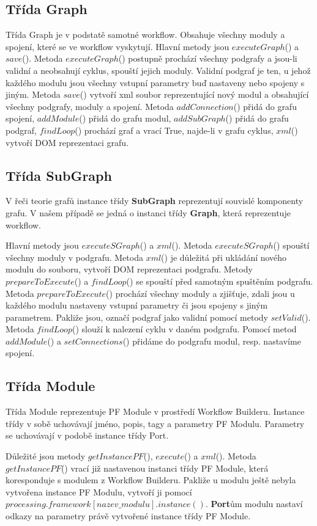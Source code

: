 \newpage
\subsection*{Třída Graph}
Třída Graph je v podstatě samotné workflow. Obsahuje všechny moduly a spojení, které se ve workflow vyskytují. Hlavní metody jsou $executeGraph$() a $save$(). Metoda $executeGraph$() postupně prochází všechny podgrafy a jsou-li validní a neobsahují cyklus, spouští jejich moduly. Validní podgraf je ten, u jehož každého modulu jsou všechny vstupní parametry buď nastaveny nebo spojeny s jiným. Metoda $save$() vytvoří xml soubor reprezentující nový modul a obsahující všechny podgrafy, moduly a spojení. Metoda $addConnection$() přidá do grafu spojení, $addModule$() přidá do grafu modul, $addSubGraph$() přidá do grafu podgraf, $findLoop$() prochází graf a vrací True, najde-li v grafu cyklus, $xml$() vytvoří DOM reprezentaci grafu.

\subsection*{Třída SubGraph}
V řeči teorie grafů instance třídy \textbf{SubGraph} reprezentují souvislé komponenty grafu. V našem případě se jedná o instanci třídy \textbf{Graph}, která reprezentuje workflow.

Hlavní metody jsou $executeSGraph$() a $xml$(). Metoda $executeSGraph$() spouští všechny moduly v podgrafu. Metoda $xml$() je důležitá při ukládání nového modulu do souboru, vytvoří DOM reprezentaci podgrafu. Metody $prepareToExecute$() a $findLoop$() se spouští před samotným spuštěním podgrafu. Metoda $prepareToExecute$() prochází všechny moduly a zjišťuje, zdali jsou u každého modulu nastaveny vstupní parametry či jsou spojeny s jiným parametrem. Pakliže jsou, označí podgraf jako validní pomocí metody $setValid$(). Metoda $findLoop$() slouží k nalezení cyklu v daném podgrafu. 
Pomocí metod $addModule$() a $setConnections$() přidáme do podgrafu modul, resp. nastavíme spojení.

\subsection*{Třída Module}
Třída Module reprezentuje PF Module v prostředí Workflow Builderu. Instance třídy v sobě uchovávají jméno, popis, tagy a parametry PF Modulu. Parametry se uchovávají v podobě instance třídy Port. 

Důležité jsou metody $getInstancePF$(), $execute$() a $xml$(). Metoda $getInstancePF$() vrací již nastavenou instanci třídy PF Module, která koresponduje s modulem z Workflow Builderu. Pakliže u modulu ještě nebyla vytvořena instance PF Modulu, vytvoří ji pomocí $processing.framework[nazev\_modulu].instance()$. \textbf{Port}ům modulu nastaví odkazy na parametry právě vytvořené instance třídy PF Module. 

